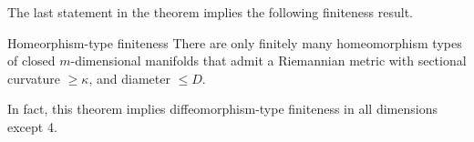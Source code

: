 The last statement in the theorem implies the following finiteness result.

\begin{thm}{Homeorphism-type finiteness}
There are only finitely many homeomorphism types of closed $m$-dimensional manifolds that admit a Riemannian metric with sectional curvature $\ge \kappa$, and diameter $\le D$.
\end{thm}

In fact, this theorem implies diffeomorphism-type finiteness in all dimensions except 4.



